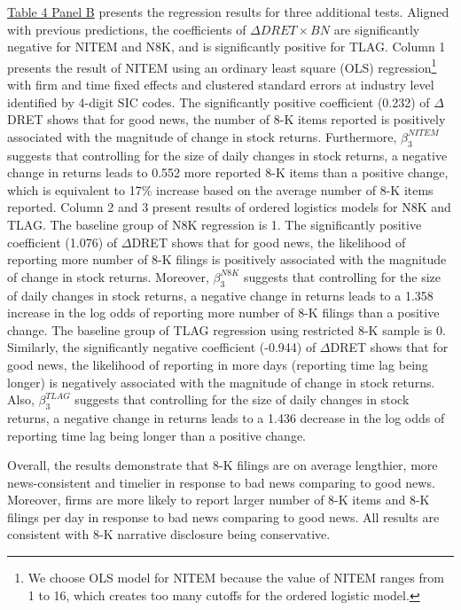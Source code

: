 \documentclass[a4paper]{article}
\begin{document}
\begin{spacing}{2}
\hyperref[T4PB]{Table 4 Panel B} presents the regression results for three additional tests. Aligned with previous predictions, the coefficients of $\Delta DRET\times BN$ are significantly negative for NITEM and N8K, and is significantly positive for TLAG. Column 1 presents the result of NITEM using an ordinary least square (OLS) regression\footnote{We choose OLS model for NITEM because the value of NITEM ranges from 1 to 16, which creates too many cutoffs for the ordered logistic model.} with firm and time fixed effects and clustered standard errors at industry level identified by 4-digit SIC codes. The significantly positive coefficient (0.232) of $\Delta$DRET shows that for good news, the number of 8-K items reported is positively associated with the magnitude of change in stock returns. Furthermore, $\beta_3^{NITEM}$ suggests that controlling for the size of daily changes in stock returns, a negative change in returns leads to 0.552 more reported 8-K items than a positive change, which is equivalent to 17\% increase based on the average number of 8-K items reported. Column 2 and 3 present results of ordered logistics models for N8K and TLAG. The baseline group of N8K regression is 1. The significantly positive coefficient (1.076) of $\Delta$DRET shows that for good news, the likelihood of reporting more number of 8-K filings is positively associated with the magnitude of change in stock returns. Moreover, $\beta_3^{N8K}$ suggests that controlling for the size of daily changes in stock returns, a negative change in returns leads to a 1.358 increase in the log odds of reporting more number of 8-K filings than a positive change. The baseline group of TLAG regression using restricted 8-K sample is 0. Similarly, the significantly negative coefficient (-0.944) of $\Delta$DRET shows that for good news, the likelihood of reporting in more days (reporting time lag being longer) is negatively associated with the magnitude of change in stock returns. Also, $\beta_3^{TLAG}$ suggests that controlling for the size of daily changes in stock returns, a negative change in returns leads to a 1.436 decrease in the log odds of reporting time lag being longer than a positive change. 

Overall, the results demonstrate that 8-K filings are on average lengthier, more news-consistent and timelier in response to bad news comparing to good news. Moreover, firms are more likely to report larger number of 8-K items and 8-K filings per day in response to bad news comparing to good news. All results are consistent with 8-K narrative disclosure being conservative.

\end{spacing}
\end{document}
